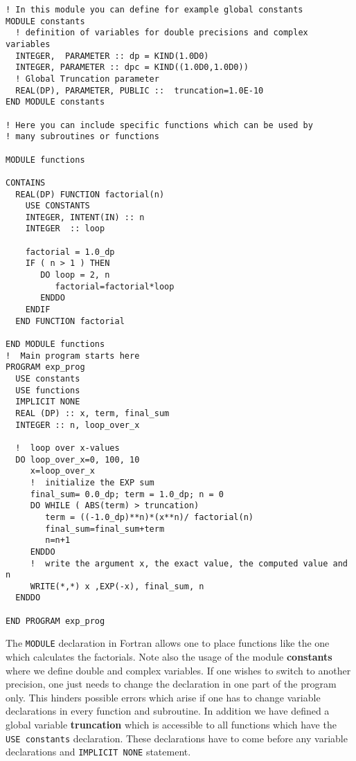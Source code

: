 \begin{lstlisting}[title={\url{http://folk.uio.no/mhjensen/compphys/programs/chapter02/Fortran/program4.f90}}]
! In this module you can define for example global constants
MODULE constants
  ! definition of variables for double precisions and complex variables 
  INTEGER,  PARAMETER :: dp = KIND(1.0D0)
  INTEGER, PARAMETER :: dpc = KIND((1.0D0,1.0D0))
  ! Global Truncation parameter
  REAL(DP), PARAMETER, PUBLIC ::  truncation=1.0E-10
END MODULE constants

! Here you can include specific functions which can be used by
! many subroutines or functions

MODULE functions

CONTAINS
  REAL(DP) FUNCTION factorial(n)
    USE CONSTANTS 
    INTEGER, INTENT(IN) :: n
    INTEGER  :: loop

    factorial = 1.0_dp
    IF ( n > 1 ) THEN
       DO loop = 2, n
          factorial=factorial*loop
       ENDDO
    ENDIF
  END FUNCTION factorial

END MODULE functions
!  Main program starts here
PROGRAM exp_prog
  USE constants
  USE functions
  IMPLICIT NONE  
  REAL (DP) :: x, term, final_sum
  INTEGER :: n, loop_over_x

  !  loop over x-values
  DO loop_over_x=0, 100, 10
     x=loop_over_x
     !  initialize the EXP sum
     final_sum= 0.0_dp; term = 1.0_dp; n = 0 
     DO WHILE ( ABS(term) > truncation)
        term = ((-1.0_dp)**n)*(x**n)/ factorial(n)
        final_sum=final_sum+term
        n=n+1
     ENDDO
     !  write the argument x, the exact value, the computed value and n
     WRITE(*,*) x ,EXP(-x), final_sum, n
  ENDDO

END PROGRAM exp_prog
\end{lstlisting}
The \lstinline?MODULE? declaration in Fortran allows one to place functions
like the one which calculates the factorials. 
Note also the usage of the module {\bf constants} where we define double and complex variables.
If one wishes to switch to another precision, one just needs to change the declaration
in one part of the program only. This hinders possible errors which arise if one has to change
variable declarations in every function and subroutine.   
In addition we have defined a global variable {\bf truncation} which is accessible to all
functions which have the \verb? USE constants? declaration. These declarations have to come
before any variable declarations and \verb?IMPLICIT NONE? statement. 
\lstset{language=[90]Fortran}
